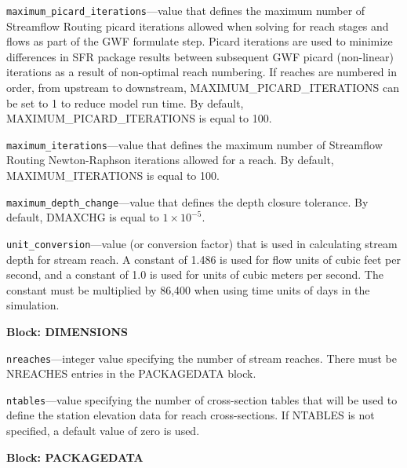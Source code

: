 \begin{description}
\item \texttt{maximum\_picard\_iterations}---value that defines the maximum number of Streamflow Routing picard iterations allowed when solving for reach stages and flows as part of the GWF formulate step. Picard iterations are used to minimize differences in SFR package results between subsequent GWF picard (non-linear) iterations as a result of non-optimal reach numbering. If reaches are numbered in order, from upstream to downstream, MAXIMUM\_PICARD\_ITERATIONS can be set to 1 to reduce model run time. By default, MAXIMUM\_PICARD\_ITERATIONS is equal to 100.

\item \texttt{maximum\_iterations}---value that defines the maximum number of Streamflow Routing Newton-Raphson iterations allowed for a reach. By default, MAXIMUM\_ITERATIONS is equal to 100.

\item \texttt{maximum\_depth\_change}---value that defines the depth closure tolerance. By default, DMAXCHG is equal to $1 \times 10^{-5}$.

\item \texttt{unit\_conversion}---value (or conversion factor) that is used in calculating stream depth for stream reach. A constant of 1.486 is used for flow units of cubic feet per second, and a constant of 1.0 is used for units of cubic meters per second. The constant must be multiplied by 86,400 when using time units of days in the simulation.

\end{description}
\item \textbf{Block: DIMENSIONS}

\begin{description}
\item \texttt{nreaches}---integer value specifying the number of stream reaches.  There must be NREACHES entries in the PACKAGEDATA block.

\item \texttt{ntables}---value specifying the number of cross-section tables that will be used to define the station elevation data for reach cross-sections. If NTABLES is not specified, a default value of zero is used.

\end{description}
\item \textbf{Block: PACKAGEDATA}

